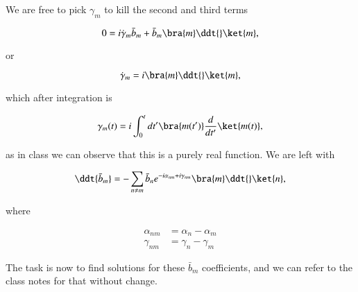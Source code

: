 We are free to pick $\gamma_m$ to kill the second and third terms

\begin{equation}\label{eqn:adiabaticPertTakeII:130}
0 =
i \dot{\gamma}_m \bar{b}_m
+ 
\bar{b}_m \bra{m} \ddt{} \ket{m},
\end{equation}

or

\begin{equation}\label{eqn:adiabaticPertTakeII:150}
\dot{\gamma}_m 
= 
i \bra{m} \ddt{} \ket{m},
\end{equation}

which after integration is

\begin{equation}\label{eqn:adiabaticPertTakeII:170}
\gamma_m(t)
= 
i \int_0^t dt' \bra{m(t')} \frac{d}{dt'} \ket{m(t)},
\end{equation}

as in class we can observe that this is a purely real function.  We are left with

\begin{equation}\label{eqn:adiabaticPertTakeII:190}
\ddt{\bar{b}_m}
=
-
\sum_{n \ne m} \bar{b}_n 
e^{-i \alpha_{nm} + i \gamma_{nm}}
\bra{m} \ddt{} \ket{n} 
,
\end{equation}

where

\begin{align}\label{eqn:adiabaticPertTakeII:210}
\alpha_{nm} &= \alpha_{n} -\alpha_m \\
\gamma_{nm} &= \gamma_{n} -\gamma_m 
\end{align}

The task is now to find solutions for these $\bar{b}_m$ coefficients, and we can refer to the class notes for that without change.

\EndArticle
